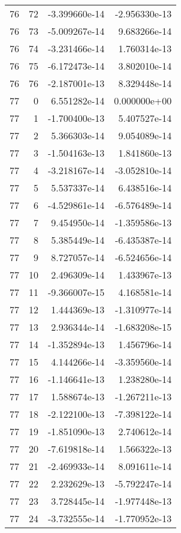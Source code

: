 \begin{tabular}{rrrr}
  76 &   72 & -3.399660e-14 & -2.956330e-13 \\
  76 &   73 & -5.009267e-14 &  9.683266e-14 \\
  76 &   74 & -3.231466e-14 &  1.760314e-13 \\
  76 &   75 & -6.172473e-14 &  3.802010e-14 \\
  76 &   76 & -2.187001e-13 &  8.329448e-14 \\
  77 &    0 &  6.551282e-14 &  0.000000e+00 \\
  77 &    1 & -1.700400e-13 &  5.407527e-14 \\
  77 &    2 &  5.366303e-14 &  9.054089e-14 \\
  77 &    3 & -1.504163e-13 &  1.841860e-13 \\
  77 &    4 & -3.218167e-14 & -3.052810e-14 \\
  77 &    5 &  5.537337e-14 &  6.438516e-14 \\
  77 &    6 & -4.529861e-14 & -6.576489e-14 \\
  77 &    7 &  9.454950e-14 & -1.359586e-13 \\
  77 &    8 &  5.385449e-14 & -6.435387e-14 \\
  77 &    9 &  8.727057e-14 & -6.524656e-14 \\
  77 &   10 &  2.496309e-14 &  1.433967e-13 \\
  77 &   11 & -9.366007e-15 &  4.168581e-14 \\
  77 &   12 &  1.444369e-13 & -1.310977e-14 \\
  77 &   13 &  2.936344e-14 & -1.683208e-15 \\
  77 &   14 & -1.352894e-13 &  1.456796e-14 \\
  77 &   15 &  4.144266e-14 & -3.359560e-14 \\
  77 &   16 & -1.146641e-13 &  1.238280e-14 \\
  77 &   17 &  1.588674e-13 & -1.267211e-13 \\
  77 &   18 & -2.122100e-13 & -7.398122e-14 \\
  77 &   19 & -1.851090e-13 &  2.740612e-14 \\
  77 &   20 & -7.619818e-14 &  1.566322e-13 \\
  77 &   21 & -2.469933e-14 &  8.091611e-14 \\
  77 &   22 &  2.232629e-13 & -5.792247e-14 \\
  77 &   23 &  3.728445e-14 & -1.977448e-13 \\
  77 &   24 & -3.732555e-14 & -1.770952e-13 \\

\end{tabular}
